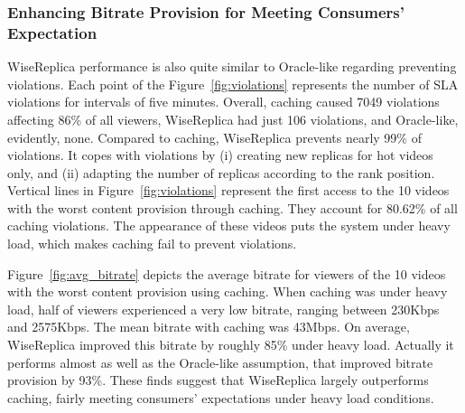 \subsubsection{Enhancing Bitrate Provision for Meeting Consumers' Expectation}

WiseReplica performance is also quite similar to Oracle-like regarding preventing violations. Each point of the Figure~\ref{fig:violations} represents the number of SLA violations for intervals of five minutes. Overall, caching caused 7049 violations affecting 86\% of all viewers, WiseReplica had just 106 violations, and Oracle-like, evidently, none. Compared to caching, WiseReplica prevents nearly 99\% of violations. It copes with violations by (i) creating new replicas for hot videos only, and (ii) adapting the number of replicas according to the rank position. Vertical lines in Figure~\ref{fig:violations} represent the first access to the 10 videos with the worst content provision through caching. They account for 80.62\% of all caching violations. The appearance of these videos puts the system under heavy load, which makes caching fail to prevent violations.

Figure~\ref{fig:avg_bitrate} depicts the average bitrate for viewers of the 10 videos with the worst content provision using caching. When caching was under heavy load, half of viewers experienced a very low bitrate, ranging between 230Kbps and 2575Kbps. The mean bitrate with caching was 43Mbps. On average, WiseReplica improved this bitrate by roughly 85\% under heavy load. Actually it performs almost as well as the Oracle-like assumption, that improved bitrate provision by 93\%. These finds suggest that WiseReplica largely outperforms caching, fairly meeting consumers' expectations under heavy load conditions.


